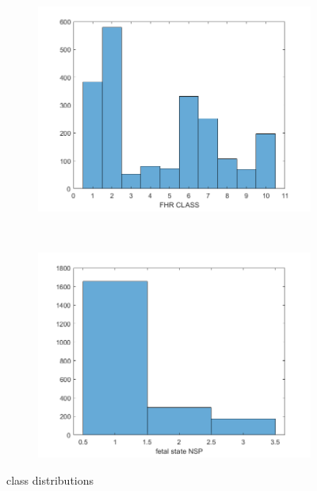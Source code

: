 \documentclass[11pt,a4paper]{article}
\begin{document}
\begin{figure}[htb]
  \centering
  \begin{subfigure}[b]{0.48\textwidth}
    \centering
    \includegraphics[width=\textwidth]{figures/CLASS_HIST.png}
  \end{subfigure}
  ~
  \begin{subfigure}[b]{0.48\textwidth}
    \centering
    \includegraphics[width=\textwidth]{figures/NSP_HIST.png}
  \end{subfigure}
  \caption{class distributions}
  \label{fig:ClassHistograms}
\end{figure}
\end{document}
